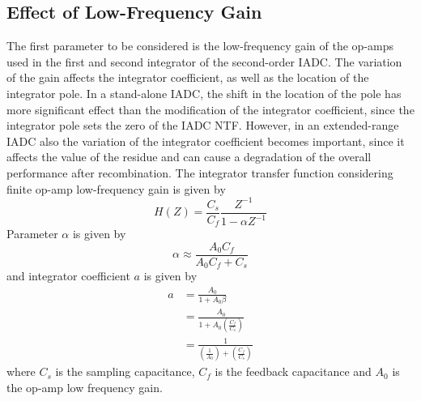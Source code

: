 \subsection{Effect of Low-Frequency Gain}
The first parameter to be considered is the low-frequency gain of the op-amps used in the first and second integrator of the second-order IADC. The variation of the gain affects the integrator coefficient, as well as the location of the integrator pole. In a stand-alone IADC, the shift in the location of the pole has more significant effect than the modification of the integrator coefficient, since the integrator pole sets the zero of the IADC NTF. However, in an extended-range IADC also the variation of the integrator coefficient becomes important, since it affects the value of the residue and can cause a degradation of the overall performance after recombination. The integrator transfer function considering finite op-amp low-frequency gain is given by \cite{TCAS_MALCOVATI} 
\begin{equation}
    H(Z)=\frac{C_s}{C_f}\frac{Z^{-1}}{1-\alpha Z^{-1}}
\end{equation}
Parameter $\alpha$ is given by
\begin{equation}
    \alpha\approx\frac{A_0C_f}{A_0C_f+C_s}
\end{equation}
and integrator coefficient $a$ is given by
\begin{equation}
\begin{split}
    a &= \frac{A_0}{1+A_0\beta}\\
      &= \frac{A_0}{1+A_0\left(\frac{C_f}{C_s}\right)}\\
      &= \frac{1}{\left(\frac{1}{A_0}\right)+\left(\frac{C_f}{C_s}\right)}
    \label{INTEG_COEFF}
\end{split}
\end{equation}
where $C_s$ is the sampling capacitance, $C_f$ is the feedback capacitance and $A_0$ is the op-amp low frequency gain.

